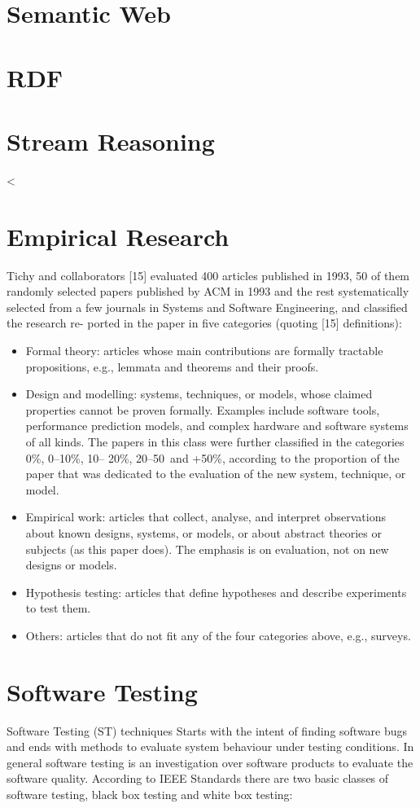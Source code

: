 \section{Semantic Web}

\section{RDF}


\section{Stream Reasoning}<
\section{Empirical Research}

Tichy and collaborators [15] evaluated 400 articles published in 1993, 50 of them randomly selected papers published by ACM in 1993 and the rest systematically selected from a few journals in Systems and Software Engineering, and classified the research re- ported in the paper in five categories (quoting [15] definitions): \begin{itemize}
\item Formal theory: articles whose main contributions are formally tractable propositions, e.g., lemmata and theorems and their proofs.
\item Design and modelling: systems, techniques, or models, whose claimed properties cannot be proven formally. Examples include software tools, performance prediction models, and complex hardware and software systems of all kinds. The papers in this class were further classified in the categories 0\%, 0–10\%, 10– 20\%, 20–50\, and +50\%, according to the proportion of the paper that was dedicated to the evaluation of the new system, technique, or model.
\item Empirical work: articles that collect, analyse, and interpret observations about known designs, systems, or models, or about abstract theories or subjects (as this paper does). The emphasis is on evaluation, not on new designs or models.
\item Hypothesis testing: articles that define hypotheses and describe experiments to test them.
\item Others: articles that do not fit any of the four categories above, e.g., surveys.
\end{itemize}

\section{Software Testing}
Software Testing (ST) techniques Starts with the intent of finding software bugs and ends with methods to evaluate system behaviour under testing conditions. In general software testing is an investigation over software products to evaluate the software quality. According to IEEE Standards  \cite{citeulike:1341545} there are two basic classes of software testing, black box testing and white box testing: 

